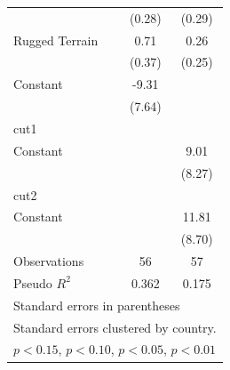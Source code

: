 \documentclass[12pt, letterpaper]{article}
\begin{document}
\begin{table}[htbp]
\begin{small}
\begin{tabular}{l*{2}{c}}
                    &      (0.28)         &      (0.29)         \\
Rugged Terrain      &        0.71\sym{*}  &        0.26         \\
                    &      (0.37)         &      (0.25)         \\
Constant            &       -9.31         &                     \\
                    &      (7.64)         &                     \\
\hline
cut1                &                     &                     \\
Constant            &                     &        9.01         \\
                    &                     &      (8.27)         \\
\hline
cut2                &                     &                     \\
Constant            &                     &       11.81         \\
                    &                     &      (8.70)         \\
\hline
Observations        &          56         &          57         \\
Pseudo \(R^{2}\)           &     0.362                &   0.175                  \\
\hline\hline
\multicolumn{3}{l}{\footnotesize Standard errors in parentheses}\\
\multicolumn{3}{l}{\footnotesize Standard errors clustered by country.}\\
\multicolumn{3}{l}{\footnotesize \sym{+} \(p<0.15\), \sym{*} \(p<0.10\), \sym{**} \(p<0.05\), \sym{***} \(p<0.01\)}\\
\end{tabular}
\end{small}
\end{table}
\end{document}
